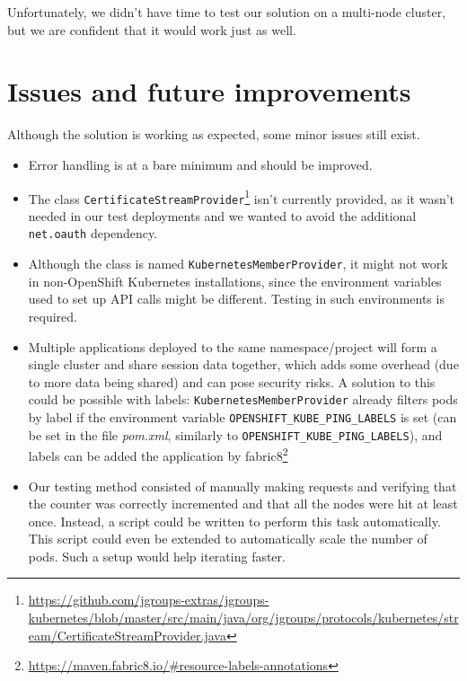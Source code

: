 \documentclass[11pt,a4paper]{article}
\begin{document}
Unfortunately, we didn't have time to test our solution on a multi-node cluster, but we are confident that it would work just as well.


\section{Issues and future improvements}

Although the solution is working as expected, some minor issues still exist.

\begin{itemize}
\item Error handling is at a bare minimum and should be improved.

\item The class \texttt{CertificateStreamProvider}\footnote{\url{https://github.com/jgroups-extras/jgroups-kubernetes/blob/master/src/main/java/org/jgroups/protocols/kubernetes/stream/CertificateStreamProvider.java}} isn't currently provided, as it wasn't needed in our test deployments and we wanted to avoid the additional \texttt{net.oauth} dependency.

\item Although the class is named \texttt{KubernetesMemberProvider}, it might not work in non-OpenShift Kubernetes installations, since the environment variables used to set up API calls might be different. Testing in such environments is required.

\item Multiple applications deployed to the same namespace/project will form a single cluster and share session data together, which adds some overhead (due to more data being shared) and can pose security risks. A solution to this could be possible with labels: \texttt{KubernetesMemberProvider} already filters pods by label if the environment variable \texttt{OPENSHIFT\_KUBE\_PING\_LABELS} is set (can be set in the file \emph{pom.xml}, similarly to \texttt{OPENSHIFT\_KUBE\_PING\_LABELS}), and labels can be added the application by fabric8\footnote{\url{https://maven.fabric8.io/\#resource-labels-annotations}}

\item Our testing method consisted of manually making requests and verifying that the counter was correctly incremented and that all the nodes were hit at least once. Instead, a script could be written to perform this task automatically. This script could even be extended to automatically scale the number of pods. Such a setup would help iterating faster.

\end{itemize}
\end{document}
